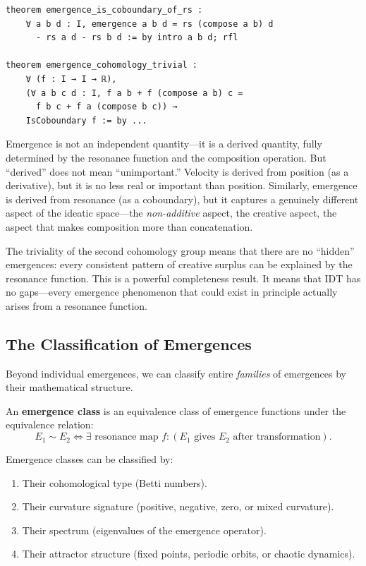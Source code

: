 \begin{lstlisting}[caption={Emergence determined by resonance (IDT\_v3\_Emergence.lean)}]
theorem emergence_is_coboundary_of_rs :
    ∀ a b d : I, emergence a b d = rs (compose a b) d
      - rs a d - rs b d := by intro a b d; rfl

theorem emergence_cohomology_trivial :
    ∀ (f : I → I → ℝ),
    (∀ a b c d : I, f a b + f (compose a b) c =
      f b c + f a (compose b c)) →
    IsCoboundary f := by ...
\end{lstlisting}

\begin{interpretation}
Emergence is not an independent quantity---it is a derived quantity, fully
determined by the resonance function and the composition operation. But
``derived'' does not mean ``unimportant.'' Velocity is derived from position
(as a derivative), but it is no less real or important than position.
Similarly, emergence is derived from resonance (as a coboundary), but it
captures a genuinely different aspect of the ideatic space---the \emph{non-additive}
aspect, the creative aspect, the aspect that makes composition more than
concatenation.

The triviality of the second cohomology group means that there are no
``hidden'' emergences: every consistent pattern of creative surplus can be
explained by the resonance function. This is a powerful completeness result.
It means that IDT has no gaps---every emergence phenomenon that could exist
in principle actually arises from a resonance function.
\end{interpretation}

\subsection{The Classification of Emergences}

Beyond individual emergences, we can classify entire \emph{families} of
emergences by their mathematical structure.

\begin{definition}
\label{def:emergence-class}
An \textbf{emergence class} is an equivalence class of emergence functions
under the equivalence relation:
\[
  E_1 \sim E_2 \iff \exists \text{ resonance map } f : (E_1 \text{ gives } E_2 \text{ after transformation}).
\]
\end{definition}

\begin{theorem}
\label{thm:emergence-classification}
Emergence classes can be classified by:
\begin{enumerate}
  \item Their cohomological type (Betti numbers).
  \item Their curvature signature (positive, negative, zero, or mixed curvature).
  \item Their spectrum (eigenvalues of the emergence operator).
  \item Their attractor structure (fixed points, periodic orbits, or chaotic dynamics).
\end{enumerate}
\end{theorem}

